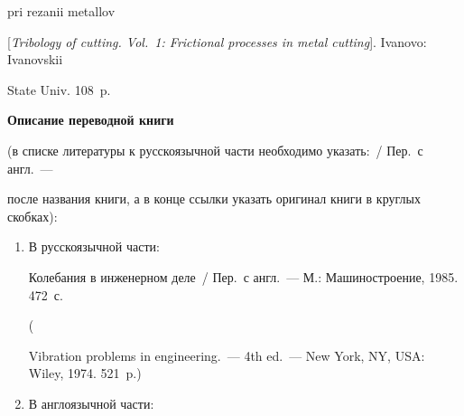 {\begin{enumerate}[1.]
{{pri rezanii metallov}


[\textit{Tribology of cutting. Vol.~1: Frictional processes in metal cutting}]. Ivanovo: Ivanovskii


State Univ. 108~p.





\def\leftkol{Правила подготовки рукописей  для публикации в журнале


<<Информатика и её применения>>}





\def\rightkol{Правила подготовки рукописей  для публикации в журнале


<<Информатика и её применения>>}





\noindent


\textbf{Описание переводной книги}


(в списке литературы к русскоязычной части необходимо указать:~/ Пер.\ с англ.~---


после названия книги, а в конце ссылки указать оригинал книги в круглых скобках):


\begin{enumerate}[1.]


\item  В русскоязычной части:





\def\leftfootline{\small{\textbf{\thepage}


\hfill ИНФОРМАТИКА И ЕЁ ПРИМЕНЕНИЯ\ \ \ том\ 18\ \ \ выпуск\ 3\ \ \ 2024}


}%


 \def\rightfootline{\small{ИНФОРМАТИКА И ЕЁ ПРИМЕНЕНИЯ\ \ \ том\ 18\ \ \ выпуск\ 3\ \ \ 2024


\hfill \textbf{\thepage}}}







Колебания в инженерном деле~/ Пер.\ с англ.~--- М.: Машиностроение, 1985. 472~с.


(


Vibration problems in engineering.~--- 4th ed.~--- New York, NY, USA: Wiley, 1974. 521~p.)\\[-13.5pt]


\item  В англоязычной части:






\end{enumerate}}
\end{enumerate}}
